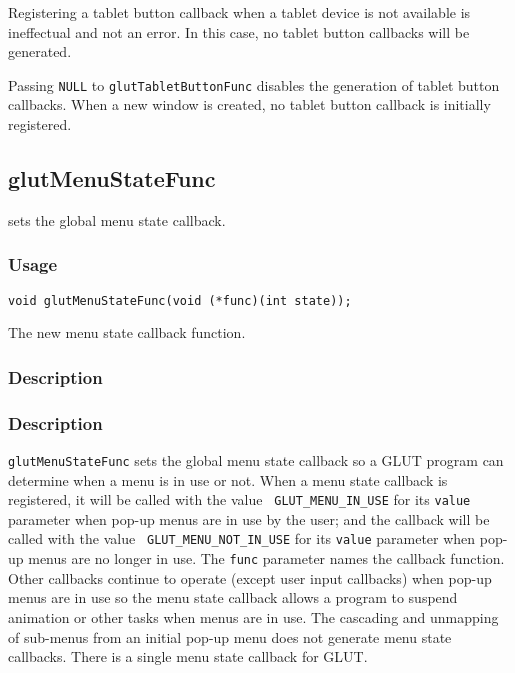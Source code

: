 Registering a tablet button callback when a tablet device is not available
is ineffectual and not an error.  In this case, no tablet button callbacks
will be generated.

Passing {\tt NULL} to {\tt glutTabletButtonFunc} disables the generation of
tablet button callbacks.  When a new window is created, no
tablet button callback is initially registered.

\subsection{glutMenuStateFunc}

 sets the global menu state callback.

\subsubsection*{Usage}
\begin{verbatim}
void glutMenuStateFunc(void (*func)(int state));
\end{verbatim}
\begin{description}
\itemsep 0in
\item[\tt func]
The new menu state callback function.
\end{description}

\subsubsection*{Description}

\subsubsection*{Description}

{\tt glutMenuStateFunc} sets the global menu state callback so a GLUT
program can determine when a menu is in use or not.  When a menu state
callback is registered, it will be called with the value {\tt
GLUT\_MENU\_IN\_USE} for its {\tt value} parameter when pop-up menus are
in use by the user; and the callback will be called with the value {\tt
GLUT\_MENU\_NOT\_IN\_USE} for its {\tt value} parameter when pop-up menus
are no longer in use.  The {\tt func} parameter names the callback
function.  Other callbacks continue to operate (except user input
callbacks) when pop-up menus are in use so the menu state callback
allows a program to suspend animation or other tasks when menus are in
use.  The cascading and unmapping of sub-menus from an initial pop-up
menu does not generate menu state callbacks.  There is
a single menu state callback for GLUT.

